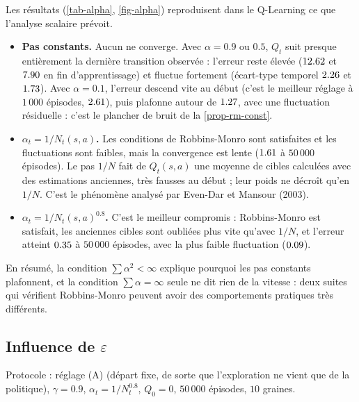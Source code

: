 Les résultats (\cref{tab-alpha}, \cref{fig-alpha}) reproduisent dans le Q-Learning ce que l'analyse scalaire prévoit.
\begin{itemize}
\item \textbf{Pas constants.} Aucun ne converge. Avec $\alpha=0.9$ ou $0.5$, $Q_t$ suit presque entièrement la dernière transition observée : l'erreur reste élevée ($12.62$ et $7.90$ en fin d'apprentissage) et fluctue fortement (écart-type temporel $2.26$ et $1.73$). Avec $\alpha=0.1$, l'erreur descend vite au début (c'est le meilleur réglage à $1\,000$ épisodes, $2.61$), puis plafonne autour de $1.27$, avec une fluctuation résiduelle : c'est le plancher de bruit de la \cref{prop-rm-const}.
\item \textbf{$\alpha_t=1/N_t(s,a)$.} Les conditions de Robbins-Monro sont satisfaites et les fluctuations sont faibles, mais la convergence est lente ($1.61$ à $50\,000$ épisodes). Le pas $1/N$ fait de $Q_t(s,a)$ une moyenne de cibles calculées avec des estimations anciennes, très fausses au début ; leur poids ne décroît qu'en $1/N$. C'est le phénomène analysé par Even-Dar et Mansour (2003).
\item \textbf{$\alpha_t=1/N_t(s,a)^{0.8}$.} C'est le meilleur compromis : Robbins-Monro est satisfait, les anciennes cibles sont oubliées plus vite qu'avec $1/N$, et l'erreur atteint $0.35$ à $50\,000$ épisodes, avec la plus faible fluctuation ($0.09$).
\end{itemize}
En résumé, la condition $\sum\alpha^2<\infty$ explique pourquoi les pas constants plafonnent, et la condition $\sum\alpha=\infty$ seule ne dit rien de la vitesse : deux suites qui vérifient Robbins-Monro peuvent avoir des comportements pratiques très différents.

\FloatBarrier
\subsection{Influence de \texorpdfstring{$\varepsilon$}{epsilon}}\label{sec-exp-eps}

Protocole : réglage (A) (départ fixe, de sorte que l'exploration ne vient que de la politique), $\gamma=0.9$, $\alpha_t=1/N_t^{0.8}$, $Q_0=0$, $50\,000$ épisodes, $10$ graines.

\begin{table}[ht]
\centering
\small
\setlength{\tabcolsep}{4pt}
\caption{Influence de $\varepsilon$ ($V^*(S)=\EpsVstar$). « opt.\ depuis $S$ » : nombre de graines dont la politique gloutonne finale a la valeur optimale en $S$ ; « récomp. moy. » : récompense moyenne par épisode \emph{pendant} l'apprentissage ; « paires jamais vues » et « visites min. » : moyennes sur les graines.}
\label{tab-eps}
\end{table}

